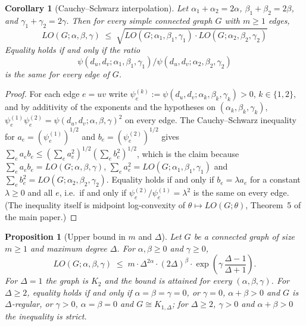 \documentclass[a5paper, 10pt]{article}
\theoremstyle{plain}
\newtheorem{proposition}[theorem]{Proposition}
\newtheorem*{corollary}{Corollary}
\theoremstyle{remark}
\theoremstyle{definition}
\newcommand{\Wuzi}{LO(G;\alpha,\beta,\gamma)}
\begin{document}
  \begin{corollary}[Cauchy--Schwarz interpolation]\label{thm:cs}
  Let $\alpha_1 + \alpha_2 = 2\alpha$, $\beta_1 + \beta_2 = 2\beta$,
  and $\gamma_1 + \gamma_2 = 2\gamma$. Then for every simple
  connected graph $G$ with $m \ge 1$ edges,
  \[
  LO(G; \alpha, \beta, \gamma)
  \;\le\;
  \sqrt{LO(G; \alpha_1, \beta_1, \gamma_1)
         \cdot LO(G; \alpha_2, \beta_2, \gamma_2)}
  \]
  Equality holds if and only if the ratio
  \[
  \psi(d_u, d_v; \alpha_1, \beta_1, \gamma_1)/\psi(d_u, d_v; \alpha_2,
  \beta_2, \gamma_2)
  \]
  is the same for every edge of $G$.
  \end{corollary}
  \begin{proof}
  For each edge $e = uv$ write
  $\psi_e^{(k)} := \psi(d_u, d_v; \alpha_k, \beta_k, \gamma_k) > 0$,
  $k \in \{1, 2\}$, and by additivity of the exponents and the hypotheses on
  $(\alpha_k, \beta_k, \gamma_k)$,
  $\psi_e^{(1)}\psi_e^{(2)} = \psi(d_u, d_v; \alpha, \beta, \gamma)^2$
  on every edge. The Cauchy--Schwarz inequality for
  $a_e = (\psi_e^{(1)})^{1/2}$ and $b_e = (\psi_e^{(2)})^{1/2}$ gives
  $\sum_e a_e b_e \le (\sum_e a_e^2)^{1/2} (\sum_e b_e^2)^{1/2}$, which
  is the claim because $\sum_e a_e b_e = \Wuzi$,
  $\sum_e a_e^2 = LO(G; \alpha_1, \beta_1, \gamma_1)$ and
  $\sum_e b_e^2 = LO(G; \alpha_2, \beta_2, \gamma_2)$. Equality holds if
  and only if $b_e = \lambda a_e$ for a constant $\lambda \ge 0$ and all
  $e$, i.e.\ if and only if
  $\psi_e^{(2)}/\psi_e^{(1)} = \lambda^2$ is the same on every edge.
  (The inequality itself is midpoint log-convexity of
  $\theta \mapsto LO(G; \theta)$, Theorem~5 of the main paper.)
  \end{proof}

  \begin{proposition}[Upper bound in $m$ and $\Delta$]\label{thm:upper_Delta}
  Let $G$ be a connected graph of size $m \ge 1$ and maximum degree $\Delta$. For
  $\alpha, \beta \ge 0$ and $\gamma \ge 0$,
  \begin{equation}\label{eq:upper_Delta}
  \Wuzi \;\le\; m \cdot \Delta^{2\alpha} \cdot (2\Delta)^{\beta}
  \cdot \exp\!\left(\gamma\,\frac{\Delta - 1}{\Delta + 1}\right).
  \end{equation}
  For $\Delta = 1$ the graph is $K_2$ and the bound is attained for every
  $(\alpha,\beta,\gamma)$. For $\Delta \ge 2$, equality holds if and only
  if $\alpha = \beta = \gamma = 0$, or $\gamma = 0$, $\alpha + \beta > 0$
  and $G$ is $\Delta$-regular, or $\gamma > 0$, $\alpha = \beta = 0$ and
  $G \cong K_{1,\Delta}$; for $\Delta \ge 2$, $\gamma > 0$ and
  $\alpha + \beta > 0$ the inequality is strict.
  \end{proposition}
\end{document}
